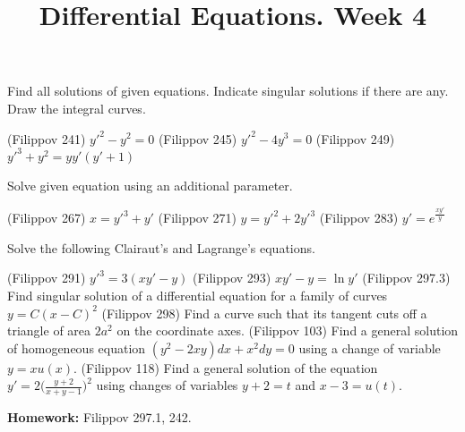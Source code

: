 \documentclass[14pt]{exam}
\title{Differential Equations. Week 4}
\date{}
\begin{document}
	\maketitle
	
	Find all solutions of given equations. Indicate singular solutions if there are any. Draw the integral curves.
	
	\begin{questions}
		\question (Filippov 241) $y'^2 - y^2 = 0$
		\question (Filippov 245) $y'^2 - 4y^3 = 0$
		\question (Filippov 249) $y'^3 + y^2 = yy'(y' + 1)$
	\end{questions}
	
	Solve given equation using an additional parameter.
	
	\begin{questions}
		\setcounter{question}{3}
		\question (Filippov 267) $x = y'^3 + y'$
		\question (Filippov 271) $y = y'^2 + 2y'^3$
		\question (Filippov 283) $y' = e^{\frac{xy'}{y}}$
	\end{questions}
	
	Solve the following Clairaut’s and Lagrange’s equations.
	
	\begin{questions}
		\setcounter{question}{6}
		\question (Filippov 291) $y'^3 = 3 (xy' - y)$
		\question (Filippov 293) $xy' - y = \ln y'$
		\question (Filippov 297.3)  Find singular solution of a differential equation for a
		family of curves $y = C(x - C)^2$
		\question (Filippov 298) Find a curve such that its tangent cuts off a triangle of area $2a^2$ on the coordinate axes.
		\question (Filippov 103) Find a general solution of homogeneous equation $(y^2 - 2xy)dx + x^2dy=0$ using a change of variable $y = x u(x)$.
		\question (Filippov 118) Find a general solution of the equation $y' = 2 \bigr(\frac{y+2}{x+y-1}\bigr)^2$ using changes of variables $y + 2 = t$ and $x - 3 = u(t)$.
	\end{questions}
	
	\textbf{Homework:} Filippov 297.1, 242.
\end{document}
